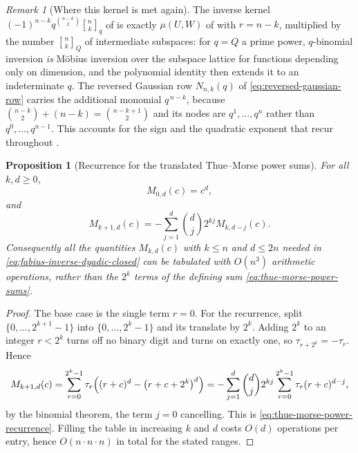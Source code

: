 \documentclass[11pt,oneside,openany]{book}
\newtheorem{proposition}[proposition]{Proposition}
\theoremstyle{definition}
\theoremstyle{remark}
\newtheorem{remark}[remark]{Remark}
\newcommand{\qbinom}[2]{\genfrac{[}{]}{0pt}{}{#1}{#2}_{q}}
\newcommand{\Qbinom}[3]{\genfrac{[}{]}{0pt}{}{#1}{#2}_{#3}}
\begin{document}
\begin{remark}[Where this kernel is met again]\label{rem:mobius-inversion-kernel}
The inverse kernel $(-1)^{n-k}q^{\binom{n-k}{2}}\qbinom nk$ of  is exactly $\mu(U,W)$ of  with $r=n-k$, multiplied by the number $\Qbinom nkQ$ of intermediate subspaces: for $q=Q$ a prime power, $q$-binomial inversion \emph{is} M\"obius inversion over the subspace lattice for functions depending only on dimension, and the polynomial identity then extends it to an indeterminate $q$.  The reversed Gaussian row $N_{n,k}(q)$ of \eqref{eq:reversed-gaussian-row} carries the additional monomial $q^{\,n-k}$, because
$\binom{n-k}{2}+(n-k)=\binom{n-k+1}{2}$ and its nodes are $q^1,\dots,q^n$ rather than $q^0,\dots,q^{n-1}$.  This accounts for the sign and the quadratic exponent that recur throughout .
\end{remark}



\begin{proposition}[Recurrence for the translated Thue--Morse power sums]\label{prop:thue-morse-power-recurrence}
For all $k,d\ge0$,
\begin{equation}\label{eq:thue-morse-power-base}
 M_{0,d}(c)=c^d,
\end{equation}
and
\begin{equation}\label{eq:thue-morse-power-recurrence}
 M_{k+1,d}(c)=-\sum_{j=1}^{d}\binom dj2^{kj}M_{k,d-j}(c).
\end{equation}
Consequently all the quantities $M_{k,d}(c)$ with $k\le n$ and $d\le2n$ needed in \eqref{eq:fabius-inverse-dyadic-closed} can be tabulated with $O(n^3)$ arithmetic operations, rather than the $2^k$ terms of the defining sum \eqref{eq:thue-morse-power-sums}.
\end{proposition}

\begin{proof}
The base case is the single term $r=0$.  For the recurrence, split $\{0,\dots,2^{k+1}-1\}$ into $\{0,\dots,2^k-1\}$ and its translate by $2^k$.  Adding $2^k$ to an integer $r<2^k$ turns off no binary digit and turns on exactly one, so $\tau_{r+2^k}=-\tau_r$.  Hence
\[
 M_{k+1,d}(c)
 =\sum_{r=0}^{2^k-1}\tau_r\Bigl((r+c)^d-\bigl(r+c+2^k\bigr)^d\Bigr)
 =-\sum_{j=1}^{d}\binom dj2^{kj}\sum_{r=0}^{2^k-1}\tau_r(r+c)^{d-j},
\]
by the binomial theorem, the term $j=0$ cancelling.  This is \eqref{eq:thue-morse-power-recurrence}.  Filling the table in increasing $k$ and $d$ costs $O(d)$ operations per entry, hence $O(n\cdot n\cdot n)$ in total for the stated ranges.
\end{proof}
\end{document}
